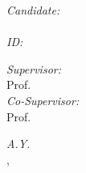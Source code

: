 \begin{titlingpage}
\begin{center}
		\begin{minipage}[t]{0.3\textwidth}
			\begin{flushleft} \large
				\emph{Candidate:}\\
				\textcolor{SchoolColor}{\AuthorName \ \textsc{\AuthorSurname}} %
				\\
				\emph{ID:} \textsc{\StudentId}
			\end{flushleft}
		\end{minipage}
		\begin{minipage}[t]{0.68\textwidth}
			\begin{flushright} \large
				\emph{Supervisor:} \\
				\textcolor{SchoolColor}{Prof. \SupName \ \textsc{\SupSurname}} %
				\vspace{10pt}\\
				\emph{Co-Supervisor:} \\
				\textcolor{SchoolColor}{Prof. \CosupName \ \textsc{\CosupSurname}} %
			\end{flushright}
		\end{minipage}

		\vfill
		\large{\textit{A.Y.} \AcademicYear}\\
		{\UnivPlace, \Date}
	\end{center}
\end{titlingpage}
